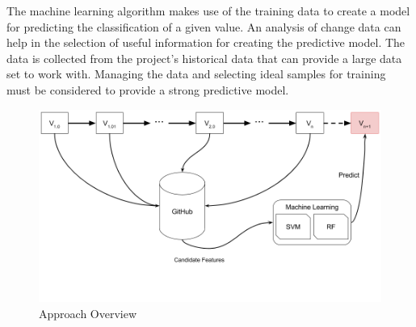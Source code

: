 

The machine learning algorithm makes use of the training data to create a model for predicting the classification of a given value. An analysis of change data can help in the selection of useful information for creating the predictive model. The data is collected from the project's historical data that can provide a large data set to work with. Managing the data and selecting ideal samples for training must be considered to provide a strong predictive model.

\begin{figure}[!ht]
    \centering
        \includegraphics[width=1.0\textwidth]{images/overview}
    \caption{Approach Overview}
    \label{fig:overview}
\end{figure}



